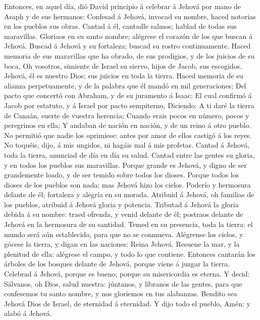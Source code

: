  Entonces, en aquel día, dió David principio á celebrar á
Jehová por mano de Asaph y de sus hermanos:  Confesad á
Jehová, invocad su nombre, haced notorias en los pueblos sus obras.
 Cantad á él, cantadle salmos; hablad de todas sus
maravillas.  Gloriaos en su santo nombre; alégrese el
corazón de los que buscan á Jehová.  Buscad á Jehová y su
fortaleza; buscad su rostro continuamente.  Haced memoria
de sus maravillas que ha obrado, de sus prodigios, y de los juicios de
su boca,  Oh vosotros, simiente de Israel su siervo, hijos
de Jacob, sus escogidos.  Jehová, él es nuestro Dios; sus
juicios en toda la tierra.  Haced memoria de su alianza
perpetuamente, y de la palabra que él mandó en mil generaciones;
 Del pacto que concertó con Abraham, y de su juramento á
Isaac;  El cual confirmó á Jacob por estatuto, y á Israel
por pacto sempiterno,  Diciendo: A ti daré la tierra de
Canaán, suerte de vuestra herencia;  Cuando erais pocos en
número, pocos y peregrinos en ella;  Y andaban de nación en
nación, y de un reino á otro pueblo.  No permitió que nadie
los oprimiese: antes por amor de ellos castigó á los reyes.
 No toquéis, dijo, á mis ungidos, ni hagáis mal á mis
profetas.  Cantad á Jehová, toda la tierra, anunciad de día
en día su salud.  Cantad entre las gentes su gloria, y en
todos los pueblos sus maravillas.  Porque grande es Jehová,
y digno de ser grandemente loado, y de ser temido sobre todos los
dioses.  Porque todos los dioses de los pueblos son nada:
mas Jehová hizo los cielos.  Poderío y hermosura delante de
él; fortaleza y alegría en su morada.  Atribuid á Jehová,
oh familias de los pueblos, atribuid á Jehová gloria y potencia.
 Tributad á Jehová la gloria debida á su nombre: traed
ofrenda, y venid delante de él; postraos delante de Jehová en la
hermosura de su santidad.  Temed en su presencia, toda la
tierra: el mundo será aún establecido, para que no se conmueva.
 Alégrense los cielos, y gócese la tierra, y digan en las
naciones: Reina Jehová.  Resuene la mar, y la plenitud de
ella: alégrese el campo, y todo lo que contiene.  Entonces
cantarán los árboles de los bosques delante de Jehová, porque viene á
juzgar la tierra.  Celebrad á Jehová, porque es bueno;
porque su misericordia es eterna.  Y decid: Sálvanos, oh
Dios, salud nuestra: júntanos, y líbranos de las gentes, para que
confesemos tu santo nombre, y nos gloriemos en tus alabanzas.
 Bendito sea Jehová Dios de Israel, de eternidad á
eternidad. Y dijo todo el pueblo, Amén: y alabó á Jehová.

